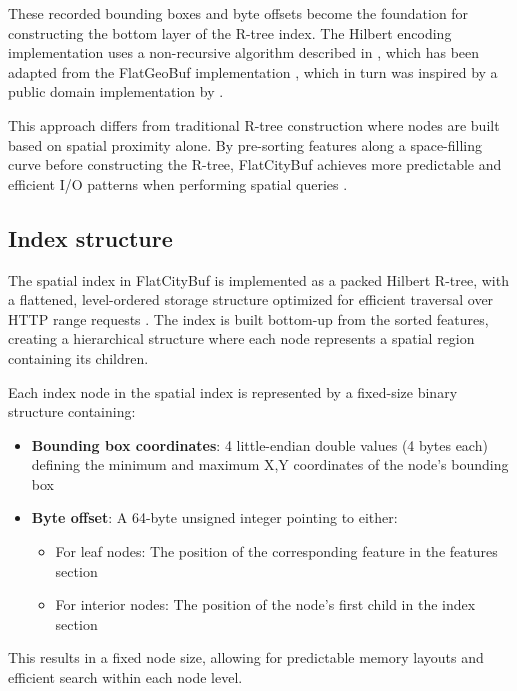 These recorded bounding boxes and byte offsets become the foundation for constructing the bottom layer of the R-tree index. The Hilbert encoding implementation uses a non-recursive algorithm described in \citet{hacker_delight_2012}, which has been adapted from the FlatGeoBuf implementation \citep{flatgeobuf_github}, which in turn was inspired by a public domain implementation by \citet{rawrunprotected_2016}.

This approach differs from traditional R-tree construction where nodes are built based on spatial proximity alone. By pre-sorting features along a space-filling curve before constructing the R-tree, FlatCityBuf achieves more predictable and efficient I/O patterns when performing spatial queries \citep{horance_2022_overview}.

\subsection{Index structure}
\label{methodology:spatial_index:index_structure}

The spatial index in FlatCityBuf is implemented as a packed Hilbert R-tree, with a flattened, level-ordered storage structure optimized for efficient traversal over HTTP range requests \citep{horance_2022_detail}. The index is built bottom-up from the sorted features, creating a hierarchical structure where each node represents a spatial region containing its children.

Each index node in the spatial index is represented by a fixed-size binary structure containing:

\begin{itemize}
  \item \textbf{Bounding box coordinates}: 4 little-endian double values (4 bytes each) defining the minimum and maximum X,Y coordinates of the node's bounding box
  \item \textbf{Byte offset}: A 64-byte unsigned integer pointing to either:
    \begin{itemize}
      \item For leaf nodes: The position of the corresponding feature in the features section
      \item For interior nodes: The position of the node's first child in the index section
    \end{itemize}
\end{itemize}

This results in a fixed node size, allowing for predictable memory layouts and efficient search within each node level.

